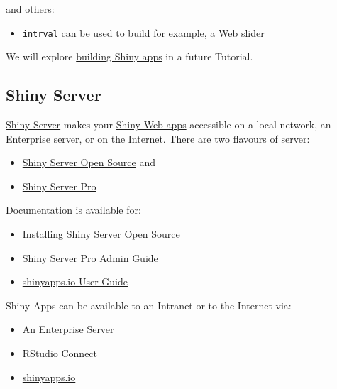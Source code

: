 \documentclass[]{book}
\providecommand{\tightlist}{%
  \setlength{\itemsep}{0pt}\setlength{\parskip}{0pt}}
\theoremstyle{definition}
\theoremstyle{definition}
\theoremstyle{definition}
\theoremstyle{remark}
\begin{document}
and others:

\begin{itemize}
\tightlist
\item
  \href{https://github.com/psolymos/intrval}{\texttt{intrval}} can be
  used to build for example, a
  \href{http://peter.solymos.org/code/2018/03/08/shiny-slider-examples-with-the-intrval-r-package.html}{Web
  slider}
\end{itemize}

We will explore \href{http://shiny.rstudio.com/}{building Shiny apps} in
a future Tutorial.

\hypertarget{shiny-server}{%
\subsection{Shiny Server}\label{shiny-server}}

\href{https://www.rstudio.com/products/shiny/shiny-server/}{Shiny
Server} makes your \href{http://shiny.rstudio.com/}{Shiny Web apps}
accessible on a local network, an Enterprise server, or on the Internet.
There are two flavours of server:

\begin{itemize}
\tightlist
\item
  \href{https://www.rstudio.com/products/shiny/download-server/}{Shiny
  Server Open Source} and
\item
  \href{https://www.rstudio.com/products/rstudio-server-pro/}{Shiny
  Server Pro}
\end{itemize}

Documentation is available for:

\begin{itemize}
\tightlist
\item
  \href{https://www.rstudio.com/products/shiny/download-server/}{Installing
  Shiny Server Open Source}
\item
  \href{http://docs.rstudio.com/shiny-server/}{Shiny Server Pro Admin
  Guide}
\item
  \href{http://docs.rstudio.com/shinyapps.io/index.html}{shinyapps.io
  User Guide}
\end{itemize}

Shiny Apps can be available to an Intranet or to the Internet via:

\begin{itemize}
\tightlist
\item
  \href{https://www.rstudio.com/products/rstudio-server-pro/}{An
  Enterprise Server}
\item
  \href{https://www.rstudio.com/products/connect/}{RStudio Connect}
\item
  \href{https://www.rstudio.com/products/shinyapps/}{shinyapps.io}
\end{itemize}
\end{document}
